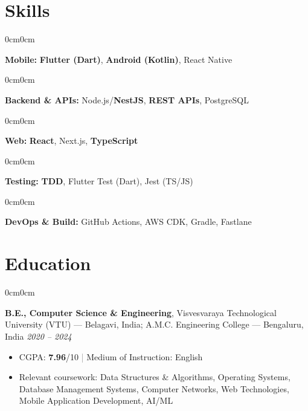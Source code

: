 \documentclass[10pt, letterpaper]{article}
\newenvironment{highlights}{
    \begin{itemize}[
        topsep=0.10 cm,
        parsep=0.10 cm,
        partopsep=0pt,
        itemsep=0.05cm, %
        leftmargin=10pt, %
        labelwidth=!, %
        labelsep=5pt %
    ]\justifying %
}{
    \end{itemize}
}
\newenvironment{onecolentry}{
    \begin{adjustwidth}{0cm}{0cm} %
    \RaggedRight %
}{
    \end{adjustwidth}
}
\begin{document}
    \section{Skills}
        \begin{onecolentry}
            \textbf{Mobile:} \textbf{Flutter (Dart)}, \textbf{Android (Kotlin)}, React Native
    \end{onecolentry}
    \vspace{0.1 cm}
        \begin{onecolentry}
            \textbf{Backend \& APIs:} Node.js/\textbf{NestJS}, \textbf{REST APIs}, PostgreSQL
    \end{onecolentry}
    \vspace{0.1 cm}
        \begin{onecolentry}
            \textbf{Web:} \textbf{React}, Next.js, \textbf{TypeScript}
    \end{onecolentry}
    \vspace{0.1 cm}
        \begin{onecolentry}
            \textbf{Testing:} \textbf{TDD}, Flutter Test (Dart), Jest (TS/JS)
    \end{onecolentry}
    \vspace{0.1 cm}
        \begin{onecolentry}
            \textbf{DevOps \& Build:} GitHub Actions, AWS CDK, Gradle, Fastlane
    \end{onecolentry}

        \section{Education}
                \begin{onecolentry}
                	\textbf{B.E., Computer Science \& Engineering}, Visvesvaraya Technological University (VTU) — Belagavi, India; A.M.C. Engineering College — Bengaluru, India \hfill \textit{2020 -- 2024}
                \vspace{0.05 cm}
                \begin{highlights}
                        \item CGPA: \textbf{7.96}/10 \quad \textcolor{gray}{|} \quad Medium of Instruction: English
                        \item Relevant coursework: Data Structures \& Algorithms, Operating Systems, Database Management Systems, Computer Networks, Web Technologies, Mobile Application Development, AI/ML
                \end{highlights}
        \end{onecolentry}
\end{document}
